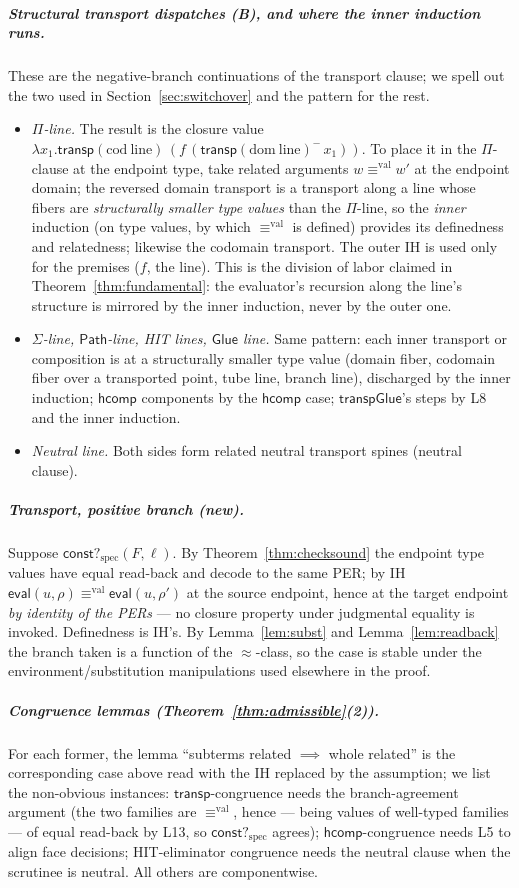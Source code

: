 \documentclass{lmcs}
\newcommand{\transp}{\mathsf{transp}}
\newcommand{\hcomp}{\mathsf{hcomp}}
\newcommand{\Glue}{\mathsf{Glue}}
\newcommand{\repeq}{\approx}
\newcommand{\valeq}{\equiv^{\mathrm{val}}}
\newcommand{\Path}{\mathsf{Path}}
\newcommand{\evalop}{\mathsf{eval}}
\newcommand{\constspec}{\mathsf{const?}_{\mathrm{spec}}}
\begin{document}
\subparagraph*{Structural transport dispatches (B), and where the
inner induction runs.}  These are the negative-branch continuations
of the transport clause; we spell out the two used in
Section~\ref{sec:switchover} and the pattern for the rest.
\begin{itemize}
\item \emph{$\Pi$-line.}  The result is the closure value
  $\lambda x_1.\transp(\mathrm{cod\ line})\,
  (f\,(\transp(\mathrm{dom\ line})^{-}\,x_1))$.  To place it in the
  $\Pi$-clause at the endpoint type, take related arguments
  $w \valeq w'$ at the endpoint domain; the reversed domain transport
  is a transport along a line whose fibers are \emph{structurally
  smaller type values} than the $\Pi$-line, so the \emph{inner}
  induction (on type values, by which $\valeq$ is defined) provides
  its definedness and relatedness; likewise the codomain transport.
  The outer IH is used only for the premises ($f$, the line).  This
  is the division of labor claimed in
  Theorem~\ref{thm:fundamental}: the evaluator's recursion along the
  line's structure is mirrored by the inner induction, never by the
  outer one.
\item \emph{$\Sigma$-line, $\Path$-line, HIT lines, $\Glue$ line.}
  Same pattern: each inner transport or composition is at a
  structurally smaller type value (domain fiber, codomain fiber over
  a transported point, tube line, branch line), discharged by the
  inner induction; $\hcomp$ components by the $\hcomp$ case;
  $\mathsf{transpGlue}$'s steps by L8 and the inner induction.
\item \emph{Neutral line.}  Both sides form related neutral
  transport spines (neutral clause).
\end{itemize}

\subparagraph*{Transport, positive branch (new).}  Suppose
$\constspec(F, \ell)$.  By Theorem~\ref{thm:checksound} the endpoint
type values have equal read-back and decode to the same PER; by IH
$\evalop(u,\rho) \valeq \evalop(u,\rho')$ at the source endpoint,
hence at the target endpoint \emph{by identity of the PERs} --- no
closure property under judgmental equality is invoked.  Definedness
is IH's.  By Lemma~\ref{lem:subst} and Lemma~\ref{lem:readback} the
branch taken is a function of the $\repeq$-class, so the case is
stable under the environment/substitution manipulations used
elsewhere in the proof.

\subparagraph*{Congruence lemmas (Theorem~\ref{thm:admissible}(2)).}
For each former, the lemma ``subterms related $\implies$ whole
related'' is the corresponding case above read with the IH replaced
by the assumption; we list the non-obvious instances:
$\transp$-congruence needs the branch-agreement argument (the two
families are $\valeq$, hence --- being values of well-typed families
--- of equal read-back by L13, so $\constspec$ agrees);
$\hcomp$-congruence needs L5 to align face decisions; HIT-eliminator
congruence needs the neutral clause when the scrutinee is neutral.
All others are componentwise.
\end{document}
